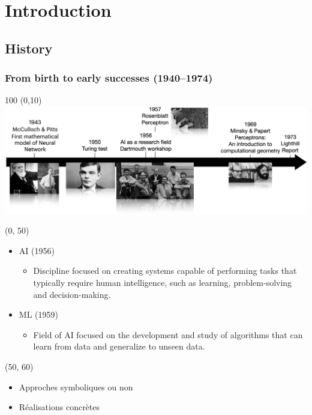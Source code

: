 \section{Introduction}

\subsection{History}

\begin{frame}
  \frametitle{From birth to early successes (1940--1974)}

  \begin{textblock}{100} (0,10)
    \includegraphics[width=\textwidth]{img/ai_history_1940_1974.png}
  \end{textblock}

  \begin{textblock}{50}(0, 50)
    \begin{itemize}
      \item AI (1956)
      \begin{itemize}
      \item \footnotesize Discipline focused on creating systems capable of performing tasks that typically require human intelligence, such as learning, problem-solving and decision-making.
      \end{itemize}
      \item ML (1959)
      \begin{itemize}
        \item \footnotesize Field of AI focused on the development and study of algorithms that can learn from data and generalize to unseen data.
      \end{itemize}
    \end{itemize}
  \end{textblock}

  \begin{textblock}{50}(50, 60)
    \begin{itemize}
      \item Approches symboliques ou non
      \item Réalisations concrètes
    \end{itemize}
  \end{textblock}

\end{frame}


